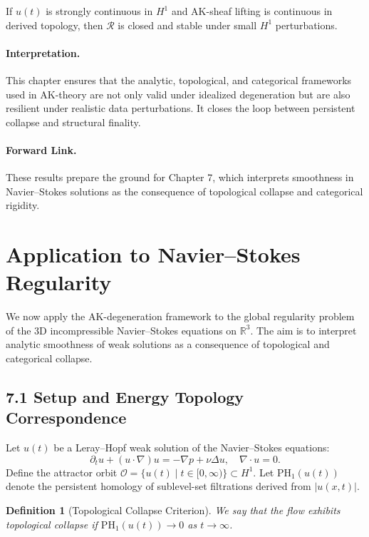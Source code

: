\documentclass[11pt]{article}
\newtheorem{definition}[theorem]{Definition}
\begin{document}
\begin{lemma}
If $u(t)$ is strongly continuous in $H^1$ and AK-sheaf lifting is continuous in derived topology, then $\mathcal{R}$ is closed and stable under small $H^1$ perturbations.
\end{lemma}

\paragraph{Interpretation.} 
This chapter ensures that the analytic, topological, and categorical frameworks used in AK-theory are not only valid under idealized degeneration but are also resilient under realistic data perturbations. It closes the loop between persistent collapse and structural finality.

\paragraph{Forward Link.}
These results prepare the ground for Chapter 7, which interprets smoothness in Navier–Stokes solutions as the consequence of topological collapse and categorical rigidity.



\section{Application to Navier--Stokes Regularity}

We now apply the AK-degeneration framework to the global regularity problem of the 3D incompressible Navier--Stokes equations on $\mathbb{R}^3$. The aim is to interpret analytic smoothness of weak solutions as a consequence of topological and categorical collapse.

\subsection{7.1 Setup and Energy Topology Correspondence}

Let $u(t)$ be a Leray–Hopf weak solution of the Navier--Stokes equations:
\[
\partial_t u + (u \cdot \nabla) u = -\nabla p + \nu \Delta u, \quad \nabla \cdot u = 0.
\]
Define the attractor orbit $\mathcal{O} = \{ u(t) \mid t \in [0, \infty) \} \subset H^1$. Let $\mathrm{PH}_1(u(t))$ denote the persistent homology of sublevel-set filtrations derived from $|u(x,t)|$.

\begin{definition}[Topological Collapse Criterion]
We say that the flow exhibits topological collapse if $\mathrm{PH}_1(u(t)) \to 0$ as $t \to \infty$.
\end{definition}
\end{document}

